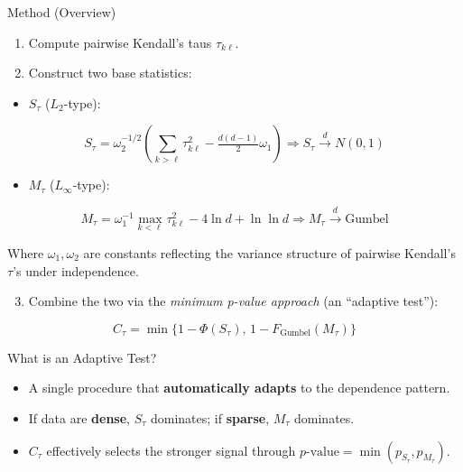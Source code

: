 \documentclass[
  ignorenonframetext,
]{beamer}
\providecommand{\tightlist}{%
  \setlength{\itemsep}{0pt}\setlength{\parskip}{0pt}}
\begin{document}
\begin{frame}[allowframebreaks]{Method (Overview)}
\label{method-overview}
\begin{enumerate}
\tightlist
\item
  Compute pairwise Kendall's taus \(\tau_{k\ell}\).\\
\item
  Construct two base statistics:
\end{enumerate}

\begin{itemize}
\tightlist
\item
  \(S_\tau\) (\(L_2\)-type):
\end{itemize}

\[
S_\tau = \omega_2^{-1/2}\!\left(\sum_{k>\ell}\tau_{k\ell}^2 - \tfrac{d(d-1)}{2}\omega_1\right)
\Rightarrow S_\tau \overset{d}{\to} N(0,1)
\]

\begin{itemize}
\tightlist
\item
  \(M_\tau\) (\(L_\infty\)-type):
\end{itemize}

\[
M_\tau = \omega_1^{-1}\max_{k<\ell}\tau_{k\ell}^2 - 4\ln d + \ln\ln d
\Rightarrow M_\tau \overset{d}{\to} \text{Gumbel}
\]

Where \(\omega_1, \omega_2\) are constants reflecting the variance
structure of pairwise Kendall's \(\tau\)'s under independence.

\begin{enumerate}
\setcounter{enumi}{2}
\tightlist
\item
  Combine the two via the \emph{minimum p-value approach} (an ``adaptive
  test''):
\end{enumerate}

\[
C_\tau = \min\{1 - \Phi(S_\tau),\, 1 - F_{\mathrm{Gumbel}}(M_\tau)\}
\]

What is an Adaptive Test?

\begin{itemize}
\tightlist
\item
  A single procedure that \textbf{automatically adapts} to the
  dependence pattern.\\
\item
  If data are \textbf{dense}, \(S_\tau\) dominates; if \textbf{sparse},
  \(M_\tau\) dominates.\\
\item
  \(C_\tau\) effectively selects the stronger signal through
  \(p\text{-value} = \min(p_{S_\tau}, p_{M_\tau})\).
\end{itemize}
\end{frame}
\end{document}
